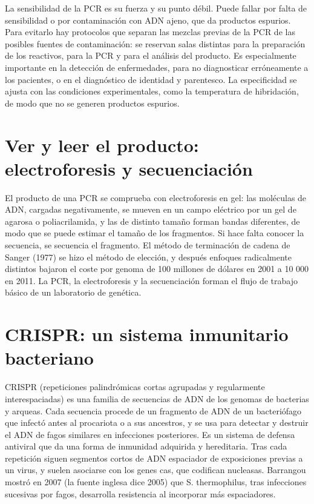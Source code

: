 \documentclass{book}
\begin{document}
La sensibilidad de la PCR es su fuerza y su punto débil. Puede fallar por falta de sensibilidad o por contaminación con ADN ajeno, que da productos espurios. Para evitarlo hay protocolos que separan las mezclas previas de la PCR de las posibles fuentes de contaminación: se reservan salas distintas para la preparación de los reactivos, para la PCR y para el análisis del producto. Es especialmente importante en la detección de enfermedades, para no diagnosticar erróneamente a los pacientes, o en el diagnóstico de identidad y parentesco. La especificidad se ajusta con las condiciones experimentales, como la temperatura de hibridación, de modo que no se generen productos espurios.


\section{Ver y leer el producto: electroforesis y secuenciación}

El producto de una PCR se comprueba con electroforesis en gel: las moléculas de ADN, cargadas negativamente, se mueven en un campo eléctrico por un gel de agarosa o poliacrilamida, y las de distinto tamaño forman bandas diferentes, de modo que se puede estimar el tamaño de los fragmentos. Si hace falta conocer la secuencia, se secuencia el fragmento. El método de terminación de cadena de Sanger (1977) se hizo el método de elección, y después enfoques radicalmente distintos bajaron el coste por genoma de 100 millones de dólares en 2001 a 10 000 en 2011. La PCR, la electroforesis y la secuenciación forman el flujo de trabajo básico de un laboratorio de genética.


\section{CRISPR: un sistema inmunitario bacteriano}

CRISPR (repeticiones palindrómicas cortas agrupadas y regularmente interespaciadas) es una familia de secuencias de ADN de los genomas de bacterias y arqueas. Cada secuencia procede de un fragmento de ADN de un bacteriófago que infectó antes al procariota o a sus ancestros, y se usa para detectar y destruir el ADN de fagos similares en infecciones posteriores. Es un sistema de defensa antiviral que da una forma de inmunidad adquirida y hereditaria. Tras cada repetición siguen segmentos cortos de ADN espaciador de exposiciones previas a un virus, y suelen asociarse con los genes cas, que codifican nucleasas. Barrangou mostró en 2007 (la fuente inglesa dice 2005) que S. thermophilus, tras infecciones sucesivas por fagos, desarrolla resistencia al incorporar más espaciadores.
\end{document}
